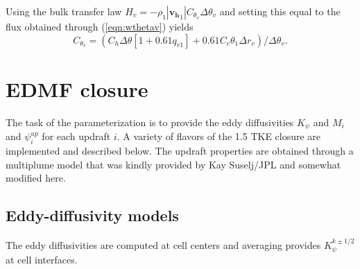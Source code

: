 \documentclass[dvipdfmx,a4paper,10pt]{article}
\begin{document}
Using the bulk transfer law $H_v=-\rho_1|\mathbf{v_h}_1| C_{\theta_v}\Delta \theta_{v}$ and setting this equal to the flux obtained through (\ref{eqn:wthetav}) yields 
\begin{equation}\label{eqn:dragvirtual}
C_{\theta_v}=(C_h\Delta \theta [1+0.61q_{v1}] + 0.61 C_e\theta_1\Delta r_v)/ \Delta \theta_{v}. 
\end{equation}



\section{EDMF closure}\label{sec:closure}

The task of the parameterization is to provide the eddy diffusivities $K_{\psi}$ and $M_i$ and $\psi^{up}_i$ for each updraft $i$. A variety of flavors of the 1.5 TKE closure are implemented and described below. The updraft properties are obtained through a multiplume model that was kindly provided by Kay Suselj/JPL and somewhat modified here.


\subsection{Eddy-diffusivity models}

The eddy diffusivities are computed at cell centers and averaging provides $K_{\psi}^{k\pm 1/2}$ at cell interfaces. 
\end{document}
